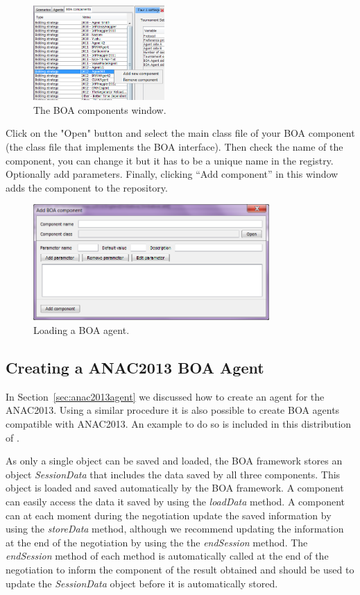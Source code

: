 \documentclass[]{article}
\begin{document}
\begin{figure}[h!] 
	\center
	\includegraphics[width=5cm]{media/AddBOA.png}
	\caption{The BOA components window.}
	\label{fig:boacomponents}
\end{figure}

Click on the "Open" button and select the main class file of your BOA component (the class file that implements the BOA interface). Then check the name of the component, you can change it but it has to be a unique name in the registry. Optionally add parameters. Finally, clicking ``Add component'' in this window adds the component to the repository.

\begin{figure}[h!] 
	\center
	\includegraphics[width=9cm]{media/LoadBOA.png}
	\caption{Loading a BOA agent.}
	\label{fig:loadBOA}
\end{figure}


\subsection{Creating a ANAC2013 BOA Agent}\label{sec:anac2013agentBOA}
In Section~\ref{sec:anac2013agent} we discussed how to create an agent for the ANAC2013. Using a similar procedure it is also possible to create BOA agents compatible with ANAC2013. An example to do so is included in this distribution of \Genius.

As only a single object can be saved and loaded, the BOA framework stores an object \textit{SessionData} that includes the data saved by all three components. This object is loaded and saved automatically by the BOA framework. A component can easily access the data it saved by using the \textit{loadData} method. A component can at each moment during the negotiation update the saved information by using the \textit{storeData} method, although we recommend updating the information at the end of the negotiation by using the the \textit{endSession} method. The \textit{endSession} method of each method is automatically called at the end of the negotiation to inform the component of the result obtained and should be used to update the \textit{SessionData} object before it is automatically stored.
\end{document}
